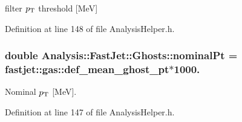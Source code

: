 filter $ p_{\rm T} $ threshold \mbox{[}MeV\mbox{]} 



Definition at line 148 of file Analysis\+Helper.\+h.

\subsubsection[{\texorpdfstring{nominal\+Pt}{nominalPt}}]{\setlength{\rightskip}{0pt plus 5cm}double Analysis\+::\+Fast\+Jet\+::\+Ghosts\+::nominal\+Pt = fastjet\+::gas\+::def\+\_\+mean\+\_\+ghost\+\_\+pt$\ast$1000.\hspace{0.3cm}{\ttfamily [static]}}\hypertarget{namespaceAnalysis_1_1FastJet_1_1Ghosts_a22e0fc0b5688c128c5a0caa65b6a4794}{}\label{namespaceAnalysis_1_1FastJet_1_1Ghosts_a22e0fc0b5688c128c5a0caa65b6a4794}


Nominal $ p_{\rm T} $ \mbox{[}MeV\mbox{]}. 



Definition at line 147 of file Analysis\+Helper.\+h.

